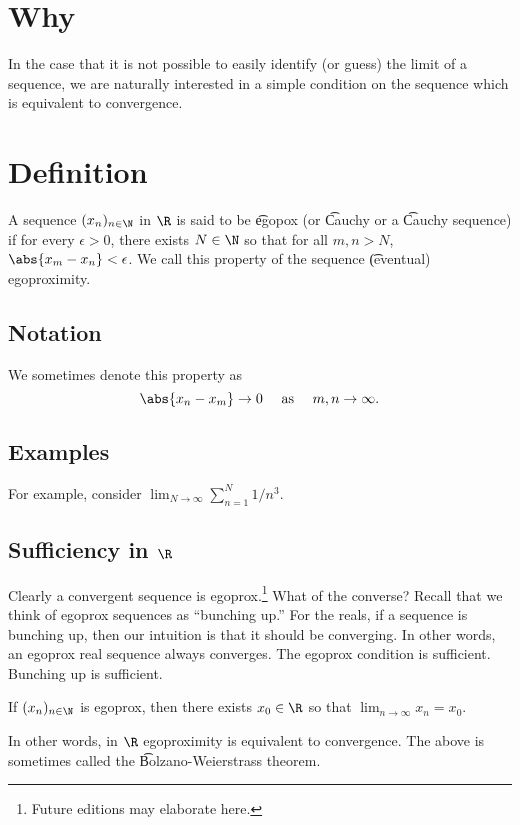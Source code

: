 

\section*{Why}

In the case that it is not possible to easily identify (or guess) the limit of a sequence, we are naturally interested in a simple condition on the sequence which is equivalent to convergence.

\section*{Definition}

A sequence $(x_n)_{n \in \N  }$ in $\R $ is said to be \t{egopox} (or \t{Cauchy} or a \t{Cauchy sequence}) if for every $\epsilon  > 0$, there exists $N \in \N  $ so that for all $m, n > N$, $\abs{x_m - x_n} < \epsilon $.
We call this property of the sequence \t{(eventual) egoproximity}.

\subsection*{Notation}

We sometimes denote this property as
\[
\abs{x_n - x_m} \to 0 \quad \text{ as } \quad m, n \to \infty.
\]

\subsection*{Examples}

For example, consider $\lim_{N \to \infty} \sum_{n = 1}^{N} 1/n^3$.

\subsection*{Sufficiency in $\R $}

Clearly a convergent sequence is egoprox.\footnote{Future editions may elaborate here.}
What of the converse?
Recall that we think of egoprox sequences as ``bunching up.''
For the reals, if a sequence is bunching up, then our intuition is that it should be converging.
In other words, an egoprox real sequence always converges.
The egoprox condition is sufficient.
Bunching up is sufficient.

\begin{proposition}
If $(x_n)_{n \in \N  }$ is egoprox, then there exists $x_0 \in \R $ so that $\lim_{n \to \infty} x_n = x_0$.
\end{proposition}

In other words, in $\R $ egoproximity is equivalent to convergence.
The above is sometimes called the \t{Bolzano-Weierstrass theorem}.

\blankpage
